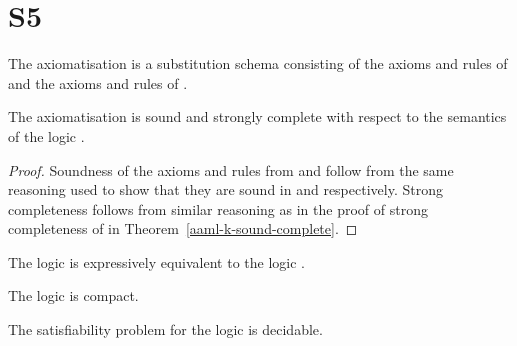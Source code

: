 \section{S5}

\begin{definition}
The axiomatisation \axiomAamlS{} is a substitution schema consisting of the axioms and rules of \axiomAmlS{} and the axioms and rules of \axiomRmlS{}.
\end{definition}

\begin{theorem}
The axiomatisation \axiomRmlS{} is sound and strongly complete with respect to the semantics of the logic \logicAamlS{}.
\end{theorem}

\begin{proof}
Soundness of the axioms and rules from \axiomAmlS{} and \axiomRmlS{} follow from the same reasoning used to show that they are sound in \logicAmlS{} and \logicRmlS{} respectively.
Strong completeness follows from similar reasoning as in the proof of strong completeness of \axiomAamlK{} in Theorem~\ref{aaml-k-sound-complete}.
\end{proof}

\begin{corollary}
The logic \logicAamlS{} is expressively equivalent to the logic \logicS{}.
\end{corollary}

\begin{corollary}
The logic \logicAamlS{} is compact.
\end{corollary}

\begin{corollary}
The satisfiability problem for the logic \logicAamlS{} is decidable.
\end{corollary}
